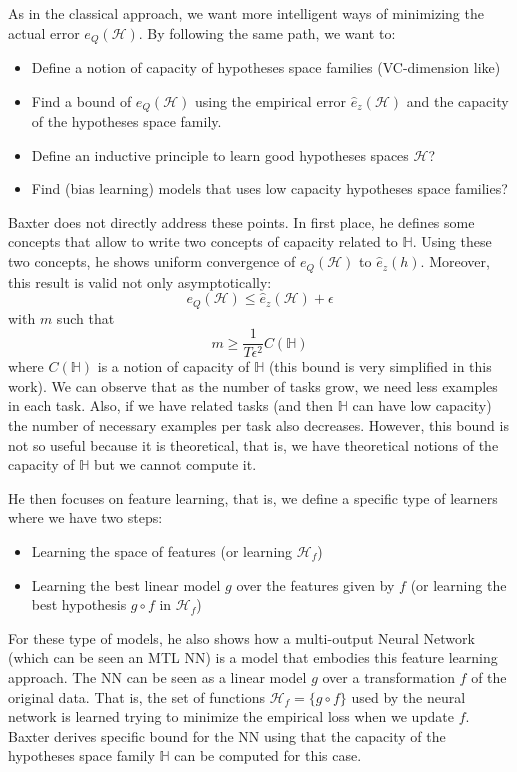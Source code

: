 As in the classical approach, we want more intelligent ways of minimizing the actual error $e_Q(\mathcal{H})$. By following the same path, we want to:
\begin{itemize}
    \item Define a notion of capacity of hypotheses space families (VC-dimension like)
    \item Find a bound of $e_Q(\mathcal{H})$ using the empirical error $\hat{e}_z(\mathcal{H})$ and the capacity of the hypotheses space family.
    \item Define an inductive principle to learn good hypotheses spaces $\mathcal{H}$?
    \item Find (bias learning) models that uses low capacity hypotheses space families?
\end{itemize}
Baxter does not directly address these points.
In first place, he defines some concepts that allow to write two concepts of capacity related to $\mathbb{H}$. Using these two concepts, he shows uniform convergence of $e_Q(\mathcal{H})$ to $\hat{e}_z(h)$. Moreover, this result is valid not only asymptotically:
\begin{equation*}
    e_Q(\mathcal{H}) \leq \hat{e}_z(\mathcal{H}) + \epsilon
\end{equation*}
with $m$ such that
\begin{equation*}
    m \geq \frac{1}{T \epsilon^2} C(\mathbb{H})
\end{equation*}
where $C(\mathbb{H})$ is a notion of capacity of $\mathbb{H}$ (this bound is very simplified in this work). We can observe that as the number of tasks grow, we need less examples in each task. Also, if we have related tasks (and then $\mathbb{H}$ can have low capacity) the number of necessary examples per task also decreases.
However, this bound is not so useful because it is theoretical, that is, we have theoretical notions of the capacity of $\mathbb{H}$ but we cannot compute it.

He then focuses on feature learning, that is, we define a specific type of learners where we have two steps:
\begin{itemize}
    \item Learning the space of features (or learning $\mathcal{H}_f$)
    \item Learning the best linear model $g$ over the features given by $f$ (or learning the best hypothesis $g \circ f$ in $\mathcal{H}_f$)
\end{itemize}
For these type of models, he also shows how a multi-output Neural Network (which can be seen an MTL NN) is a model that embodies this feature learning approach.
The NN can be seen as a linear model $g$ over a transformation $f$ of the original data. That is, the set of functions $\mathcal{H}_f = \{g \circ f \}$ used by the neural network is learned trying to minimize the empirical loss when we update $f$.
Baxter derives specific bound for the NN using that the capacity of the hypotheses space family $\mathbb{H}$ can be computed for this case.

